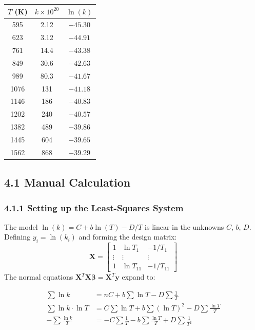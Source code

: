 \documentclass[12pt,a4paper]{article}
\begin{document}
\begin{center}
\begin{tabular}{ccc}
  \toprule
  $T$ (K) & $k \times 10^{20}$ & $\ln(k)$ \\
  \midrule
  595  & 2.12  & $-45.30$ \\
  623  & 3.12  & $-44.91$ \\
  761  & 14.4  & $-43.38$ \\
  849  & 30.6  & $-42.63$ \\
  989  & 80.3  & $-41.67$ \\
  1076 & 131   & $-41.18$ \\
  1146 & 186   & $-40.83$ \\
  1202 & 240   & $-40.57$ \\
  1382 & 489   & $-39.86$ \\
  1445 & 604   & $-39.65$ \\
  1562 & 868   & $-39.29$ \\
  \bottomrule
\end{tabular}
\end{center}

\subsection{4.1 Manual Calculation}

\subsubsection{4.1.1 Setting up the Least-Squares System}

The model $\ln(k) = C + b\ln(T) - D/T$ is linear in the unknowns $C$, $b$, $D$. Defining
$y_i = \ln(k_i)$ and forming the design matrix:
\[
\mathbf{X} = \begin{bmatrix} 1 & \ln T_1 & -1/T_1 \\ \vdots & \vdots & \vdots \\ 1 & \ln T_{11} & -1/T_{11} \end{bmatrix}
\]
The normal equations $\mathbf{X}^T\mathbf{X}\boldsymbol{\beta} = \mathbf{X}^T\mathbf{y}$ expand to:

\begin{align*}
\sum \ln k &= nC + b\sum\ln T - D\sum\frac{1}{T} \\
\sum \ln k\cdot\ln T &= C\sum\ln T + b\sum(\ln T)^2 - D\sum\frac{\ln T}{T} \\
-\sum \frac{\ln k}{T} &= -C\sum\frac{1}{T} - b\sum\frac{\ln T}{T} + D\sum\frac{1}{T^2}
\end{align*}
\end{document}
